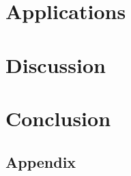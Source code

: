 \documentclass[licencjacka,en]{pracamgr}
\begin{document}







\chapter{Applications}\label{r:applications}

\chapter{Discussion}\label{r:discussion}

\chapter{Conclusion}\label{r:conclusion}

\appendix
\section{Appendix}
\end{document}

